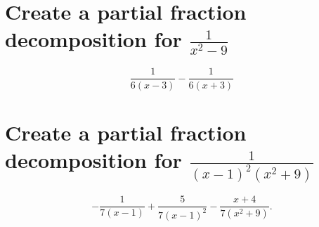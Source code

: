 \documentclass[a4paper]{article}
\title{Quiz #5}
\author{yawnbo}
\date{\today}
\begin{document}
\section{Create a partial fraction decomposition for $\frac{1}{x^2-9}$}%
\label{sec:Question 1}

\[
\frac{1}{6\left( x-3 \right) } - \frac{1}{6\left( x+3 \right) }
\] 

\section{Create a partial fraction decomposition for $\frac{1}{\left( x-1 \right) ^2\left( x^2+9 \right) }$}%
\[
-\frac{1}{7\left( x-1 \right) }+\frac{5}{7\left( x-1 \right) ^2}-\frac{x+4}{7\left( x^2+9 \right) }
.\] 
\end{document}
